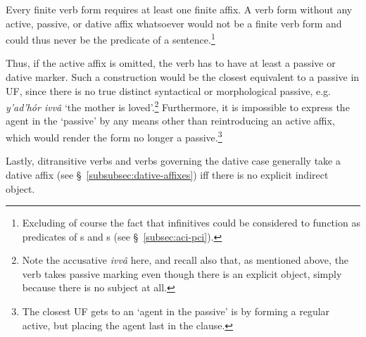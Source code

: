 \documentclass[a4paper, 12pt, twoside, final]{article}
\let \w \textit
\begin{document}
Every finite verb form requires at least one finite affix. A verb form without any active, passive, or dative affix whatsoever
would not be a finite verb form and could thus never be the predicate of a sentence.\footnote{Excluding of course the fact
that infinitives could be considered to function as predicates of s and s (see §~\ref{subsec:aci-pci}).}

Thus, if the active affix is omitted, the verb has to have at least a passive or dative marker.
Such a construction would be the closest equivalent to a passive in UF, since there is
no true distinct syntactical or morphological passive, e.g. \w{y’ad’hór ivvâ} ‘the mother is loved’.\footnote{Note the accusative
\textit{ivvâ} here, and recall also that, as mentioned above, the verb takes passive marking even though there is an explicit
object, simply because there is no subject at all.} Furthermore, it is impossible to express the agent
in the ‘passive’ by any
means other than reintroducing an active affix, which would render the form no longer a passive.\footnote{The closest
UF gets to an ‘agent in the passive’ is by forming a regular active, but placing the agent last in the clause.}

Lastly, ditransitive verbs and verbs governing the dative case generally take a dative affix (see
§~\ref{subsubsec:dative-affixes}) iff there is no explicit indirect object.
\end{document}
